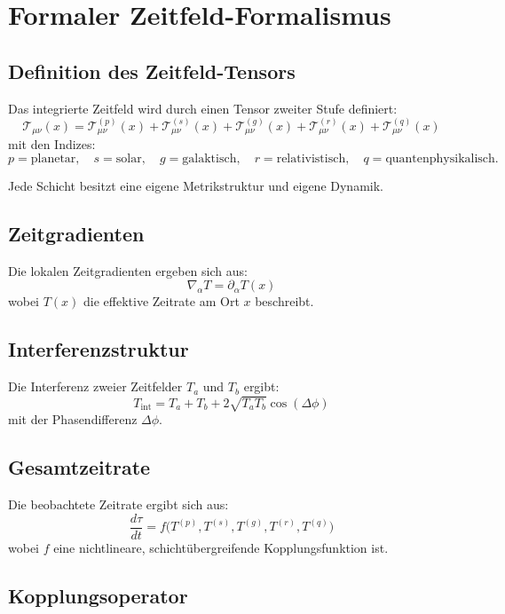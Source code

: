 
\section{Formaler Zeitfeld-Formalismus}

\subsection{Definition des Zeitfeld-Tensors}

Das integrierte Zeitfeld wird durch einen Tensor zweiter Stufe definiert:
\[
\mathcal{T}_{\mu\nu}(x) = 
\mathcal{T}^{(p)}_{\mu\nu}(x) +
\mathcal{T}^{(s)}_{\mu\nu}(x) +
\mathcal{T}^{(g)}_{\mu\nu}(x) +
\mathcal{T}^{(r)}_{\mu\nu}(x) +
\mathcal{T}^{(q)}_{\mu\nu}(x)
\]
mit den Indizes:
\[
p = \text{planetar}, \quad
s = \text{solar}, \quad
g = \text{galaktisch}, \quad
r = \text{relativistisch}, \quad
q = \text{quantenphysikalisch}.
\]

Jede Schicht besitzt eine eigene Metrikstruktur und eigene Dynamik.

\subsection{Zeitgradienten}

Die lokalen Zeitgradienten ergeben sich aus:
\[
\nabla_\alpha T = \partial_\alpha T(x)
\]
wobei $T(x)$ die effektive Zeitrate am Ort $x$ beschreibt.

\subsection{Interferenzstruktur}

Die Interferenz zweier Zeitfelder $T_a$ und $T_b$ ergibt:
\[
T_{\text{int}} = T_a + T_b + 2\sqrt{T_a T_b}\cos(\Delta\phi)
\]
mit der Phasendifferenz $\Delta\phi$.

\subsection{Gesamtzeitrate}

Die beobachtete Zeitrate ergibt sich aus:
\[
\frac{d\tau}{dt} = f\big(
T^{(p)}, T^{(s)}, T^{(g)}, T^{(r)}, T^{(q)}
\big)
\]
wobei $f$ eine nichtlineare, schichtübergreifende Kopplungsfunktion ist.

\subsection{Kopplungsoperator}

